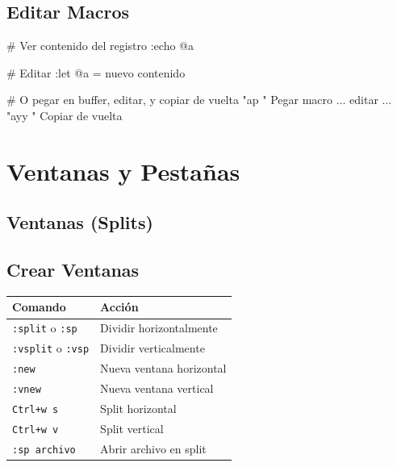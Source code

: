 \documentclass[
  doc,
  floatsintext,
  longtable,
  a4paper,
  nolmodern,
  notxfonts,
  notimes,
  12pt,
  colorlinks=true,linkcolor=blue,citecolor=blue,urlcolor=blue]{apa7}
\newenvironment{Shaded}{\begin{snugshade}}{\end{snugshade}}
\newcommand{\NormalTok}[1]{\textcolor[rgb]{0.00,0.23,0.31}{#1}}
\newcounter{none} %
\begin{document}
\subsection{Editar Macros}\label{editar-macros}

\begin{Shaded}
\begin{Highlighting}[]
\NormalTok{\# Ver contenido del registro}
\NormalTok{:echo @a}

\NormalTok{\# Editar}
\NormalTok{:let @a = \textquotesingle{}nuevo contenido\textquotesingle{}}

\NormalTok{\# O pegar en buffer, editar, y copiar de vuelta}
\NormalTok{"ap             " Pegar macro}
\NormalTok{... editar ...}
\NormalTok{"ayy            " Copiar de vuelta}
\end{Highlighting}
\end{Shaded}

\section{Ventanas y Pestañas}\label{ventanas-y-pestauxf1as}

\subsection{Ventanas (Splits)}\label{ventanas-splits}

\subsection{Crear Ventanas}\label{crear-ventanas}

{\def\LTcaptype{none} %
\begin{longtable}[]{@{}ll@{}}
\toprule\noalign{}
Comando & Acción \\
\midrule\noalign{}
\endhead
\bottomrule\noalign{}
\endlastfoot
\texttt{:split} o \texttt{:sp} & Dividir horizontalmente \\
\texttt{:vsplit} o \texttt{:vsp} & Dividir verticalmente \\
\texttt{:new} & Nueva ventana horizontal \\
\texttt{:vnew} & Nueva ventana vertical \\
\texttt{Ctrl+w\ s} & Split horizontal \\
\texttt{Ctrl+w\ v} & Split vertical \\
\texttt{:sp\ archivo} & Abrir archivo en split \\
\end{longtable}
}
\end{document}
